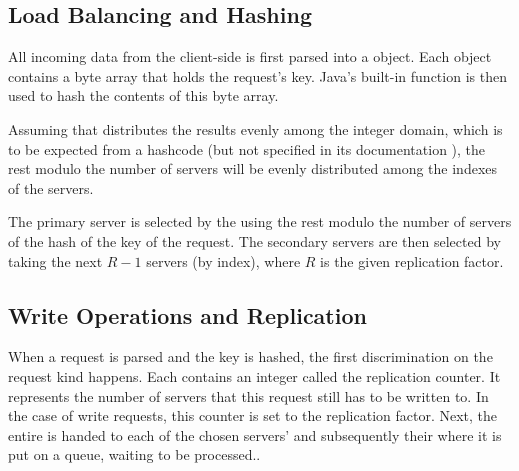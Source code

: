 \documentclass[11pt]{article}
\begin{document}


\subsection{Load Balancing and Hashing}\label{sec:desc:hashing}

% 
All incoming data from the client-side is first parsed into a  object.
Each  object contains a byte array that holds the request's key.
Java's built-in function  is then used to hash the contents of this byte array.

Assuming that  distributes the results evenly among the integer domain, which is to be expected from a hashcode (but not specified in its documentation \cite{javaArrayHash}), the rest modulo the number of servers will be evenly distributed among the indexes of the servers.

The primary server is selected by the using the rest modulo the number of servers of the hash of the key of the request.
The secondary servers are then selected by taking the next $R-1$ servers (by index), where $R$ is the given replication factor.


\subsection{Write Operations and Replication}\label{sec:desc:writes}

% 

When a request is parsed and the key is hashed, the first discrimination on the request kind happens.
Each  contains an integer called the replication counter.
It represents the number of servers that this request still has to be written to.
In the case of write requests, this counter is set to the replication factor.
Next, the entire  is handed to each of the chosen servers'  and subsequently their  where it is put on a queue, waiting to be processed..
\end{document}
